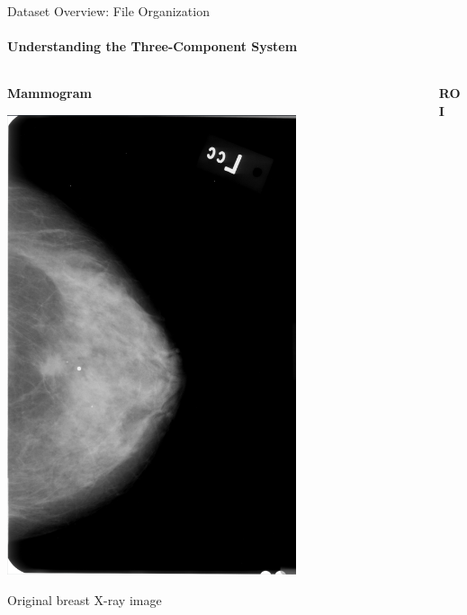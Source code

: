 \documentclass[8pt,aspectratio=169,xcolor=dvipsnames]{beamer}
\begin{document}
\begin{frame}{Dataset Overview: File Organization}
    \framesubtitle{Understanding the Three-Component System}
    
    \begin{columns}
        \begin{column}{0.3\textwidth}
            \centering
            \textbf{Mammogram}
            \vspace{0.2cm}
            
            \includegraphics[width=0.7\textwidth]{ddsmmammo.png}
            
            \small
            Original breast X-ray image
        \end{column}
        
        \begin{column}{0.3\textwidth}
            \centering
            \textbf{ROI}
            \vspace{0.2cm}
            

\end{column}
\end{columns}
\end{frame}
\end{document}
